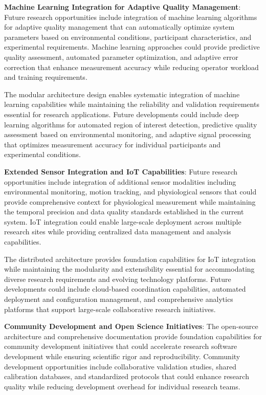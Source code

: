 \documentclass[12pt,a4paper]{article}
\begin{document}
\textbf{Machine Learning Integration for Adaptive Quality Management}: Future research opportunities include integration of
machine learning algorithms for adaptive quality management that can automatically optimize system parameters based on
environmental conditions, participant characteristics, and experimental requirements. Machine learning approaches could
provide predictive quality assessment, automated parameter optimization, and adaptive error correction that enhance
measurement accuracy while reducing operator workload and training requirements.

The modular architecture design enables systematic integration of machine learning capabilities while maintaining the
reliability and validation requirements essential for research applications. Future developments could include deep
learning algorithms for automated region of interest detection, predictive quality assessment based on environmental
monitoring, and adaptive signal processing that optimizes measurement accuracy for individual participants and
experimental conditions.

\textbf{Extended Sensor Integration and IoT Capabilities}: Future research opportunities include integration of additional
sensor modalities including environmental monitoring, motion tracking, and physiological sensors that could provide
comprehensive context for physiological measurement while maintaining the temporal precision and data quality standards
established in the current system. IoT integration could enable large-scale deployment across multiple research sites
while providing centralized data management and analysis capabilities.

The distributed architecture provides foundation capabilities for IoT integration while maintaining the modularity and
extensibility essential for accommodating diverse research requirements and evolving technology platforms. Future
developments could include cloud-based coordination capabilities, automated deployment and configuration management, and
comprehensive analytics platforms that support large-scale collaborative research initiatives.

\textbf{Community Development and Open Science Initiatives}: The open-source architecture and comprehensive documentation
provide foundation capabilities for community development initiatives that could accelerate research software
development while ensuring scientific rigor and reproducibility. Community development opportunities include
collaborative validation studies, shared calibration databases, and standardized protocols that could enhance research
quality while reducing development overhead for individual research teams.
\end{document}
